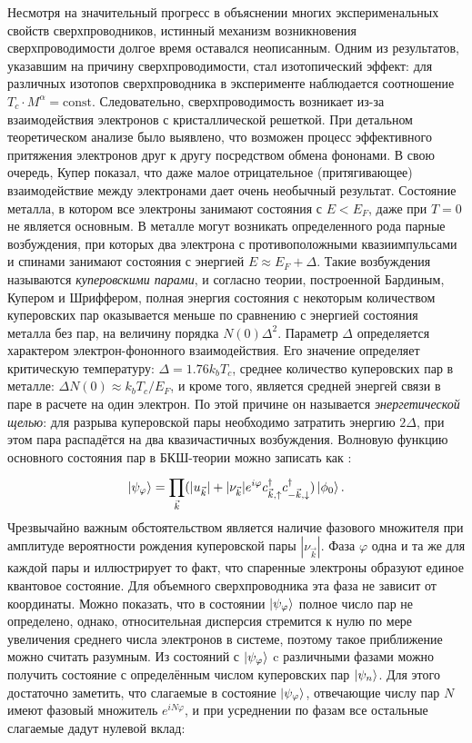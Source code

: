 Несмотря на значительный прогресс в объяснении многих эксперименальных свойств сверхпроводников, истинный механизм возникновения сверхпроводимости долгое время оставался неописанным. Одним из результатов, указавшим на причину сверхпроводимости, стал изотопический эффект: для различных изотопов сверхпроводника в эксперименте наблюдается соотношение $T_c \cdot M^{\alpha}=\text{const}$. Следовательно, сверхпроводимость возникает из-за взаимодействия электронов с кристаллической решеткой. При детальном теоретическом анализе было выявлено, что возможен процесс эффективного притяжения электронов друг к другу посредством обмена фононами. В свою очередь, Купер показал, что даже малое отрицательное (притягивающее) взаимодействие между электронами дает очень необычный результат. Состояние металла, в котором все электроны занимают состояния с $E<E_F$, даже при $T=0$ не является основным. В металле могут возникать определенного рода парные возбуждения, при которых два электрона с противоположными квазиимпульсами и спинами занимают состояния с энергией $E\approx E_F + \Delta$. Такие возбуждения называются \textit{куперовскими парами}, и согласно теории, построенной Бардиным, Купером и Шриффером, полная энергия состояния с некоторым количеством куперовских пар оказывается меньше по сравнению с энергией состояния металла без пар, на величину порядка $N(0)\Delta^2$. Параметр $\Delta$ определяется характером электрон-фононного взаимодействия. Его значение определяет критическую температуру: $\Delta = 1.76 k_b T_c$, среднее количество куперовских пар в металле: $\Delta N(0) \approx k_b T_c/E_F$, и кроме того, является средней энергей связи в паре в расчете на один электрон. По этой причине он называется \textit{энергетической щелью}: для разрыва куперовской пары необходимо затратить энергию $2\Delta$, при этом пара распадётся на два квазичастичных возбуждения. Волновую функцию основного состояния пар в БКШ-теории можно записать как \cite{Tinkham}:
\begin{equation}
\ket{\psi_\varphi} = \prod_{\vec{k}}^{}(|u_{\vec{k}}|+|\nu_{\vec{k}}|e^{i\varphi}c^\dag_{\vec{k},\uparrow}c^\dagger_{-\vec{k}, \downarrow})\ket{\phi_0}.
\end{equation}  
Чрезвычайно важным обстоятельством является наличие фазового множителя при амплитуде вероятности рождения куперовской пары $|\nu_{\vec{k}}|$. Фаза $\varphi$ одна и та же для каждой пары и иллюстрирует то факт, что спаренные электроны образуют единое квантовое состояние. Для объемного сверхпроводника эта фаза не зависит от координаты. Можно показать, что в состоянии $\ket{\psi_\varphi}$ полное число пар не определено, однако, относительная дисперсия стремится к нулю по мере увеличения среднего числа электронов в системе, поэтому такое приближение можно считать разумным. Из состояний с $\ket{\psi_\varphi}$ c различными фазами можно получить состояние с определённым числом куперовских пар $\ket{\psi_n}$. Для этого достаточно заметить, что слагаемые в состояние $\ket{\psi_\varphi}$, отвечающие числу пар $N$ имеют фазовый множитель $e^{iN{\varphi}}$, и при усреднении по фазам все остальные слагаемые дадут нулевой вклад:
